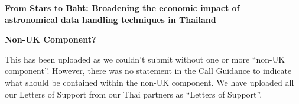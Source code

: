 \documentclass[11pt]{article}
\begin{document}
    \setcounter{figure}{0}
    \noindent
    {\LARGE \bf From Stars to Baht: Broadening the economic impact of \\
    astronomical data handling techniques in Thailand}
    
    \vspace{3mm}
    \noindent
    {\LARGE \bf Non-UK Component?}
    
    \vspace{3mm}
    \noindent
    This has been uploaded as we couldn't submit without one or more ``non-UK component''. However, there was no statement in the Call Guidance to indicate what should be contained within the non-UK component. We have uploaded all our Letters of Support from our Thai partners as ``Letters of Support''.
\end{document}

